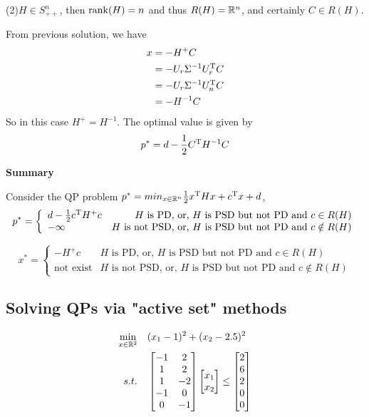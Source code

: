 (2)$H\in S^n_{++}$, then $\operatorname{rank}(H) = n$ and thus $R(H)=\mathbb{R}^n$, and certainly $C \in R(H)$.

From previous solution, we have
\begin{align*}
x 
&= -H^{+}C\\
&= -U_r \Sigma^{-1} U_r^{{\rm T}} C\\
&= -U_r \Sigma^{-1} U_n^{{\rm T}} C\\
&= - H^{-1} C
\end{align*}
So in this case $H^+ = H^{-1}$. The optimal value is given by
$$p^* = d - \frac{1}{2}C^{{\rm T}}H^{-1}C$$


\textbf{Summary }

Consider the QP problem $p^* = min_{x\in \mathbb{R}^n}\frac{1}{2}x^{{\rm T}}Hx + c^{{\rm T}}x + d$,
\begin{equation}
p^* = \left\{
\begin{array}{lr}
d - \frac{1}{2}c^{{\rm T}}H^+c &\text{$H$ is PD, or, $H$ is PSD but not PD and $c \in R(H)$}\\
-\infty &\text{$H$ is not PSD, or, $H$ is PSD but not PD and $c\notin R(H)$}
\end{array}
\right.\nonumber
\end{equation}

\begin{equation}
x^* = \left\{
\begin{array}{lr}
-H^+c &\text{$H$ is PD, or, $H$ is PSD but not PD and $c \in R(H)$}\\
\text{not exist} &\text{$H$ is not PSD, or, $H$ is PSD but not PD and $c\notin R(H)$}
\end{array}
\right.\nonumber
\end{equation}

\vspace{0.5cm}
\subsection{Solving QPs via "active set" methods}

\begin{align*}
\min_{x\in \mathbb{R}^2} \quad & (x_1 - 1)^2 + (x_2 - 2.5)^2 \\
s.t. \quad&
\begin{bmatrix}
-1&2\\
1&2\\
1&-2\\
-1&0\\
0&-1
\end{bmatrix}
\begin{bmatrix}
x_1\\
x_2
\end{bmatrix}
\leq
\begin{bmatrix}
2\\
6\\
2\\
0\\
0
\end{bmatrix}
\end{align*}

